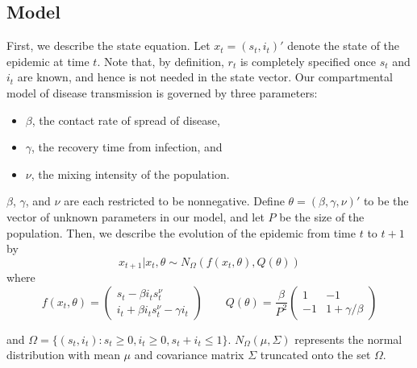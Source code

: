 \documentclass{elsarticle}
\begin{document}
\subsection{Model \label{sec:model}}

First, we describe the state equation. Let $x_t = (s_t,i_t)'$ denote the state of the epidemic at time $t$. Note that, by definition, $r_t$ is completely specified once $s_t$ and $i_t$ are known, and hence is not needed in the state vector. Our compartmental model of disease transmission is governed by three parameters:

\begin{itemize}
\item $\beta$, the contact rate of spread of disease,
\item $\gamma$, the recovery time from infection, and
\item $\nu$, the mixing intensity of the population.
\end{itemize}

\noindent $\beta$, $\gamma$, and $\nu$ are each restricted to be nonnegative. Define $\theta = (\beta,\gamma,\nu)'$ to be the vector of unknown parameters in our model, and let $P$ be the size of the population. Then, we describe the evolution of the epidemic from time $t$ to $t + 1$ by
\begin{equation}
x_{t+1}\left|x_t,\theta\right. \sim N_\Omega\left(f(x_t,\theta),Q(\theta)\right) \label{eqn:state}
\end{equation}
\noindent where
\[
f(x_t,\theta) = \left(
\begin{array}{c}
s_t - \beta i_ts^{\nu}_t \phantom{- \gamma i_t}\,\, \\
i_t +  \beta i_ts^\nu_t - \gamma i_t
\end{array}
\right)
\qquad
Q(\theta) = \frac{\beta}{P^2} \left(
\begin{array}{ccccc}
1 & -1 \\
-1 & 1 + \gamma/\beta
\end{array}
\right)
\]

\noindent and $\Omega = \{(s_t,i_t): s_t \ge 0, i_t \ge 0, s_t + i_t \le 1\}$. $N_{\Omega}(\mu,\Sigma)$ represents the normal distribution with mean $\mu$ and covariance matrix $\Sigma$ truncated onto the set $\Omega$. %
\end{document}
